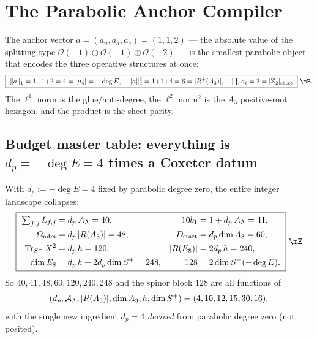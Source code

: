 \section{The Parabolic Anchor Compiler}
The anchor vector $a=(a_u,a_d,a_e)=(1,1,2)$ --- the absolute value of the splitting type
$\mathcal O(-1)\oplus\mathcal O(-1)\oplus\mathcal O(-2)$ --- is the smallest parabolic object that
encodes the three operative structures at once:
\begin{equation}
  \boxed{\ \|a\|_1=1{+}1{+}2=4=|\mu_4|=-\deg E,\quad
  \|a\|_2^2=1{+}1{+}4=6=|R^+(A_3)|,\quad
  \textstyle\prod_i a_i=2=|\mathbb Z_2|_{\text{sheet}}\ }\ \mE .
\end{equation}
The $\ell^1$ norm is the glue/anti-degree, the $\ell^2$ norm$^2$ is the $A_3$ positive-root hexagon, and
the product is the sheet parity.

\subsection{Budget master table: everything is $d_p=-\deg E=4$ times a Coxeter datum}
With $d_p:=-\deg E=4$ fixed by parabolic degree zero, the entire integer landscape collapses:
\begin{equation}
\boxed{\ \setlength{\arraycolsep}{2pt}\begin{aligned}
  \textstyle\sum_{f,j}L_{f,j}&=d_p\,\AL=40, & 10b_1&=1+d_p\,\AL=41, \\
  \Oadm&=d_p\,|R(A_3)|=48, & \Dstart&=d_p\dim A_3=60, \\
  \operatorname{Tr}_{S^+}X^2&=d_p\,h=120, & |R(E_8)|&=2d_p\,h=240, \\
  \dim E_8&=d_p\,h+2d_p\dim S^+=248, & 128&=2\dim S^+(-\deg E).
\end{aligned}\ }\ \mE
\end{equation}
So $40,41,48,60,120,240,248$ and the spinor block $128$ are all functions of
\[(d_p,\mathcal A_\Lambda,|R(A_3)|,\dim A_3,h,\dim S^+)=(4,10,12,15,30,16),\]
with the single new ingredient $d_p=4$ \emph{derived} from parabolic degree zero (not posited).

